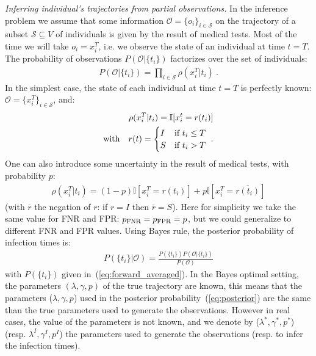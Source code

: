 \documentclass[a4paper, amsfonts, amssymb, amsmath, reprint, showkeys, nofootinbib, twoside, floatfix, pre,superscriptaddress]{revtex4-2}
\begin{document}
{\it Inferring individual's trajectories from partial observations.}
In the inference problem we assume that some information $\mathcal{O}=\{o_i\}_{i\in\mathcal{S}}$ on the trajectory of a subset $\mathcal{S}\subseteq V$ of individuals is given by the result of medical tests. 
Most of the time we will take $o_i=x_i^T$, i.e. we observe the state of an individual at time $t=T$.
The probability of observations $P(\mathcal{O}|\{t_i\})$ factorizes over the set of individuals:
\begin{align}
\label{eq:observations}
P(\mathcal{O}|\{t_i\})=\prod_{i\in\mathcal{S}}\rho(x_i^T|t_i) \ .
\end{align}
In the simplest case, the state of each individual at time $t=T$ is perfectly known: $\mathcal{O}=\{x_i^T\}_{i\in \mathcal{S}}$, and:
\begin{align*}
	\rho(x_i^T|t_i)=\mathbb{I}[x_i^t=r(t_i) ] \\
	{\rm with} \quad r(t)=\begin{cases}
		I & \text{if $t_i\leq T$}\\
		S & \text{if $t_i>T$}
\end{cases} \ .	
\end{align*}
One can also introduce some uncertainty in the result of medical tests, with probability $p$:
\begin{align}
	\label{eq:prob_falserate}
	\rho(x_i^T|t_i)=(1-p)\mathbb{I}[x_i^T= r(t_i)] + p\mathbb{I}[x_i^T= \overline{r(t_i)}] 
\end{align}
(with $\overline{r}$ the negation of $r$: if $r=I$ then $\overline{r}=S$). Here for simplicity we take the same value for FNR and FPR: $p_{\rm FNR}=p_{\rm FPR}=p$, but we could generalize to different FNR and FPR values.
Using Bayes rule, the posterior probability of infection times is:
\begin{align}
\label{eq:posterior}
P(\{t_i\}|\mathcal{O}) = \frac{P(\{t_i\})P(\mathcal{O}|\{t_i\})}{P(\mathcal{O})}
\end{align}
with $P(\{t_i\})$ given in~(\ref{eq:forward_averaged}).
In the Bayes optimal setting, the parameters $(\lambda,\gamma, p)$ of the true trajectory are known, this means that the parameters ($\lambda, \gamma, p$) used in the posterior probability~(\ref{eq:posterior}) are the same than the true parameters used to generate the observations.
However in real cases, the value of the parameters is not known, and we denote by ($\lambda^*, \gamma^*, p^*$) (resp. $\lambda^I, \gamma^I, p^I$) the parameters used to generate the observations (resp. to infer the infection times).
\end{document}

